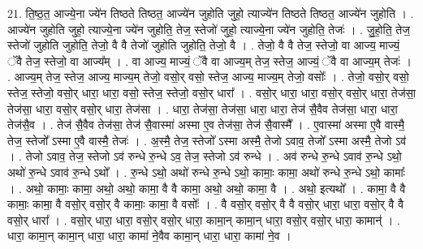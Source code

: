 \documentclass[17pt]{extarticle}
\begin{document}
21. ति॒ष्ठ॒त॒ आज्ये॒ना ज्ये॑न तिष्ठते तिष्ठत॒ आज्ये॑न जुहोति जुहो॒ त्याज्ये॑न तिष्ठते तिष्ठत॒ आज्ये॑न जुहोति । . आज्ये॑न जुहोति जुहो॒ त्याज्ये॒ना ज्ये॑न जुहोति॒ तेज॒ स्तेजो॑ जुहो॒ त्याज्ये॒ना ज्ये॑न जुहोति॒ तेजः॑ । . जु॒हो॒ति॒ तेज॒ स्तेजो॑ जुहोति जुहोति॒ तेजो॒ वै वै तेजो॑ जुहोति जुहोति॒ तेजो॒ वै । . तेजो॒ वै वै तेज॒ स्तेजो॒ वा आज्य॒ माज्यं॒ ॅवै तेज॒ स्तेजो॒ वा आज्य᳚म् । . वा आज्य॒ माज्यं॒ ॅवै वा आज्य॒म् तेज॒ स्तेज॒ आज्यं॒ ॅवै वा आज्य॒म् तेजः॑ । . आज्य॒म् तेज॒ स्तेज॒ आज्य॒ माज्य॒म् तेजो॒ वसो॒र् वसो॒ स्तेज॒ आज्य॒ माज्य॒म् तेजो॒ वसोः᳚ । . तेजो॒ वसो॒र् वसो॒ स्तेज॒ स्तेजो॒ वसो॒र् धारा॒ धारा॒ वसो॒ स्तेज॒ स्तेजो॒ वसो॒र् धारा᳚ । . वसो॒र् धारा॒ धारा॒ वसो॒र् वसो॒र् धारा॒ तेज॑सा॒ तेज॑सा॒ धारा॒ वसो॒र् वसो॒र् धारा॒ तेज॑सा । . धारा॒ तेज॑सा॒ तेज॑सा॒ धारा॒ धारा॒ तेज॑ सै॒वैव तेज॑सा॒ धारा॒ धारा॒ तेज॑सै॒व । . तेज॑ सै॒वैव तेज॑सा॒ तेज॑ सै॒वास्मा॑ अस्मा ए॒व तेज॑सा॒ तेज॑ सै॒वास्मै᳚ । . ए॒वास्मा॑ अस्मा ए॒वै वास्मै॒ तेज॒ स्तेजो᳚ ऽस्मा ए॒वै वास्मै॒ तेजः॑ । . अ॒स्मै॒ तेज॒ स्तेजो᳚ ऽस्मा अस्मै॒ तेजो ऽवाव॒ तेजो᳚ ऽस्मा अस्मै॒ तेजो ऽव॑ । . तेजो ऽवाव॒ तेज॒ स्तेजो ऽव॑ रुन्धे रु॒न्धे ऽव॒ तेज॒ स्तेजो ऽव॑ रुन्धे । . अव॑ रुन्धे रु॒न्धे ऽवाव॑ रु॒न्धे ऽथो॒ अथो॑ रु॒न्धे ऽवाव॑ रु॒न्धे ऽथो᳚ । . रु॒न्धे ऽथो॒ अथो॑ रुन्धे रु॒न्धे ऽथो॒ कामाः॒ कामा॒ अथो॑ रुन्धे रु॒न्धे ऽथो॒ कामाः᳚ । . अथो॒ कामाः॒ कामा॒ अथो॒ अथो॒ कामा॒ वै वै कामा॒ अथो॒ अथो॒ कामा॒ वै । . अथो॒ इत्यथो᳚ । . कामा॒ वै वै कामाः॒ कामा॒ वै वसो॒र् वसो॒र् वै कामाः॒ कामा॒ वै वसोः᳚ । . वै वसो॒र् वसो॒र् वै वै वसो॒र् धारा॒ धारा॒ वसो॒र् वै वै वसो॒र् धारा᳚ । . वसो॒र् धारा॒ धारा॒ वसो॒र् वसो॒र् धारा॒ कामा॒न् कामा॒न् धारा॒ वसो॒र् वसो॒र् धारा॒ कामान्॑ । . धारा॒ कामा॒न् कामा॒न् धारा॒ धारा॒ कामा॑ ने॒वैव कामा॒न् धारा॒ धारा॒ कामा॑ ने॒व । \newline
\end{document}
